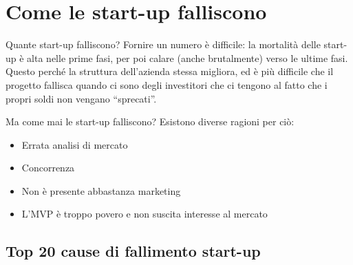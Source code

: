 \section{Come le start-up falliscono}

Quante start-up falliscono? Fornire un numero è difficile: la mortalità delle
start-up è alta nelle prime fasi, per poi calare (anche brutalmente) verso le
ultime fasi. Questo perché la struttura dell'azienda stessa migliora, ed è più
difficile che il progetto fallisca quando ci sono degli investitori che ci
tengono al fatto che i propri soldi non vengano ``sprecati''.

Ma come mai le start-up falliscono? Esistono diverse ragioni per ciò:
\begin{itemize}
 \item Errata analisi di mercato
 \item Concorrenza
 \item Non è presente abbastanza marketing
 \item L'MVP è troppo povero e non suscita interesse al mercato
\end{itemize}

\subsection{Top 20 cause di fallimento start-up}

